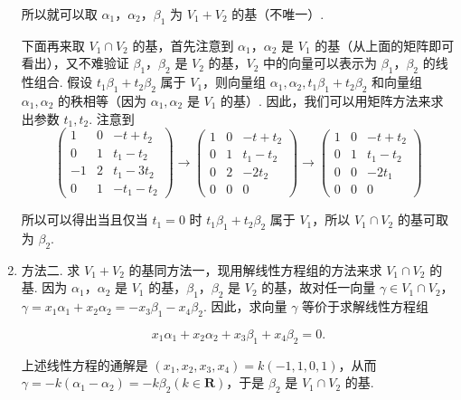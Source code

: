 \begin{solution}
\begin{enumerate}
              所以就可以取 $\alpha_1$，$\alpha_2$，$\beta_1$ 为 $V_1 + V_2$ 的基（不唯一）.

              下面再来取 $V_1\cap V_2$ 的基，首先注意到 $\alpha_1$，$\alpha_2$ 是 $V_1$ 的基（从上面的矩阵即可看出），又不难验证 $\beta_1$，$\beta_2$ 是 $V_2$ 的基，$V_2$ 中的向量可以表示为 $\beta_1$，$\beta_2$ 的线性组合. 假设 $t_1\beta_1 + t_2\beta_2$ 属于 $V_1$，则向量组 $\alpha_1, \alpha_2, t_1\beta_1 + t_2\beta_2$ 和向量组 $\alpha_1, \alpha_2$ 的秩相等（因为 $\alpha_1, \alpha_2$ 是 $V_1$ 的基）. 因此，我们可以用矩阵方法来求出参数 $t_1, t_2$. 注意到
              \[ \begin{pmatrix}
                      1  & 0 & -t + t_2   \\
                      0  & 1 & t_1 - t_2  \\
                      -1 & 2 & t_1 - 3t_2 \\
                      0  & 1 & -t_1 - t_2
                  \end{pmatrix} \xrightarrow{} \begin{pmatrix}
                      1 & 0 & -t + t_2  \\
                      0 & 1 & t_1 - t_2 \\
                      0 & 2 & -2t_2     \\
                      0 & 0 & 0
                  \end{pmatrix} \xrightarrow{} \begin{pmatrix}
                      1 & 0 & -t + t_2  \\
                      0 & 1 & t_1 - t_2 \\
                      0 & 0 & -2t_1     \\
                      0 & 0 & 0
                  \end{pmatrix} \]

              所以可以得出当且仅当 $t_1 = 0$ 时 $t_1\beta_1 + t_2\beta_2$ 属于 $V_1$，所以 $V_1 \cap V_2$ 的基可取为 $\beta_2$.

        \item 方法二. 求 $V_1 + V_2$ 的基同方法一，现用解线性方程组的方法来求 $V_1 \cap V_2$ 的基. 因为 $\alpha_1$，$\alpha_2$ 是 $V_1$ 的基，$\beta_1$，$\beta_2$ 是 $V_2$ 的基，故对任一向量 $\gamma \in V_1 \cap V_2$，$\gamma = x_1\alpha_1 + x_2\alpha_2 = -x_3\beta_1 - x_4\beta_2$. 因此，求向量 $\gamma$ 等价于求解线性方程组

              \[ x_1\alpha_1 + x_2\alpha_2 + x_3\beta_1 + x_4\beta_2 = 0. \]

              上述线性方程的通解是 $(x_1, x_2, x_3, x_4) = k(-1, 1, 0, 1)$，从而 $\gamma = -k(\alpha_1 - \alpha_2) = -k\beta_2 (k \in \mathbf{R})$，于是 $\beta_2$ 是 $V_1 \cap V_2$ 的基.
    \end{enumerate}
\end{solution}

